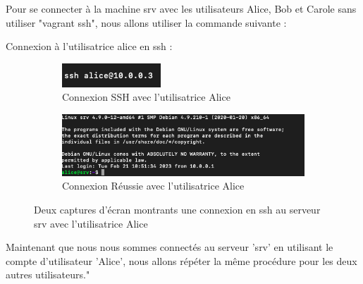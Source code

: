 \documentclass[12pt]{article}
\begin{document}
Pour se connecter à la machine srv avec les utilisateurs Alice, Bob et Carole sans utiliser "vagrant ssh", nous allons utiliser la commande suivante :

\vspace{0.3cm}

Connexion à l'utilisatrice alice en ssh  : 

\vspace{0.3cm}

\begin{figure}[h]
  \centering
  \begin{subfigure}{0.30\textwidth}
    \centering
    \includegraphics[width=\textwidth]{Images-Client-SSH/Image-TD-SSH-1/SSH-Alice.png}
    \caption{Connexion SSH avec l'utilisatrice Alice}
  \end{subfigure}
  \vspace{0.9cm} %
  \begin{subfigure}{0.45\textwidth}
    \centering
    \includegraphics[width=\textwidth]{Images-Client-SSH/Image-TD-SSH-1/Connexion-SSH-Alice.png}
    \caption{Connexion Réussie avec l'utilisatrice Alice}
  \end{subfigure}
  \caption{Deux captures d'écran montrants une connexion en ssh au serveur srv avec l'utilisatrice Alice}
\end{figure}

\vspace{0.3cm}

Maintenant que nous nous sommes connectés au serveur 'srv' en utilisant le compte d'utilisateur 'Alice', nous allons répéter la même procédure pour les deux autres utilisateurs."

\vspace{0.3cm}

\newpage
\end{document}
